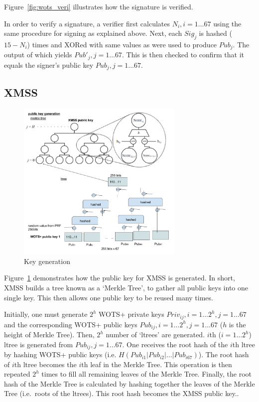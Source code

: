 \documentclass[a4paper,10pt,twocolumn]{article}
\begin{document}
 Figure~\ref{fig:wots_veri} illustrates how the signature is verified.

 In order to verify a signature, a verifier first calculates \(N_i, i=1 \ldots 67 \) using the same procedure for signing as explained 
 above. Next, each \( Sig_j \) is hashed (\(15-N_i\)) times and XORed with same values as were used to produce \( Pub_{j} \). The output 
 of which yields \( Pub'_j , j=1 \ldots 67\). This is then checked to confirm that it equals the signer's public key \( Pub_j,  j=1 
 \ldots 67 \).

\subsection{XMSS}

\begin{figure}[ht]
	\begin{center}
	\includegraphics[width=80mm]{xmss_pub.png}
	  \caption{Key generation}
    \label{fig:xmss_pub}
	\end{center}
 \end{figure}

Figure~\ref{fig:xmss_pub} demonstrates how the public key for XMSS is generated. In short, XMSS builds a tree known as a `Merkle Tree',
to gather all public keys into one single key. This then allows one public key to be reused many times.

Initially, one must generate \( 2^h \) WOTS+ private keys \( Priv_{ij}, i = 1 \ldots 2^h ,  j=1 \ldots 67\) and the
corresponding WOTS+ public keys \( Pub_{ij}, i = 1 \ldots 2^h , j=1 \ldots 67 \)  (\(h\) is the height of Merkle Tree).
Then, \(2^h\) number of `ltrees' are generated. \(i\)th (\(i = 1 \ldots 2^h\)) ltree is generated from
\( Pub_{ij}, j = 1 \ldots 67 \). One receives the root hash of the \(i\)th
ltree by hashing WOTS+ public keys (i.e. \( H(Pub_{i1} |  Pub_{i2} | \ldots  |  Pub_{i67} ) \)). The root hash of \(i\)th ltree
becomes the \(i\)th leaf in the Merkle Tree. This operation is then repeated \( 2^h \) times to fill all remaining leaves of the Merkle Tree.
Finally, the 
root hash of the Merkle Tree is calculated by hashing together the leaves of the Merkle Tree (i.e.\ roots of the ltrees). This root 
hash becomes the XMSS public key..
\end{document}

